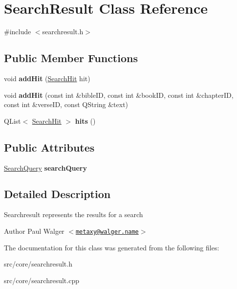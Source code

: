 \hypertarget{classSearchResult}{
\section{SearchResult Class Reference}
\label{classSearchResult}
}


{\ttfamily \#include $<$searchresult.h$>$}

\subsection*{Public Member Functions}
\begin{DoxyCompactItemize}
\item 
\hypertarget{classSearchResult_a667865865cfa6841417137acf6cb9409}{
void {\bfseries addHit} (\hyperlink{classSearchHit}{SearchHit} hit)}
\label{classSearchResult_a667865865cfa6841417137acf6cb9409}

\item 
\hypertarget{classSearchResult_aedc8e1bfb130801533466a0626919742}{
void {\bfseries addHit} (const int \&bibleID, const int \&bookID, const int \&chapterID, const int \&verseID, const QString \&text)}
\label{classSearchResult_aedc8e1bfb130801533466a0626919742}

\item 
\hypertarget{classSearchResult_a64c07b8339ad97bd92fddc130db18786}{
QList$<$ \hyperlink{classSearchHit}{SearchHit} $>$ {\bfseries hits} ()}
\label{classSearchResult_a64c07b8339ad97bd92fddc130db18786}

\end{DoxyCompactItemize}
\subsection*{Public Attributes}
\begin{DoxyCompactItemize}
\item 
\hypertarget{classSearchResult_af9cfb561f67a5d32fd713680e34ca72a}{
\hyperlink{classSearchQuery}{SearchQuery} {\bfseries searchQuery}}
\label{classSearchResult_af9cfb561f67a5d32fd713680e34ca72a}

\end{DoxyCompactItemize}


\subsection{Detailed Description}
Searchresult represents the results for a search

\begin{DoxyAuthor}{Author}
Paul Walger $<$\href{mailto:metaxy@walger.name}{\tt metaxy@walger.name}$>$ 
\end{DoxyAuthor}


The documentation for this class was generated from the following files:\begin{DoxyCompactItemize}
\item 
src/core/searchresult.h\item 
src/core/searchresult.cpp\end{DoxyCompactItemize}
